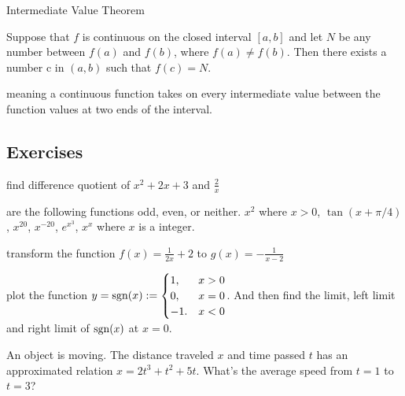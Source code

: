 \documentclass[Calculus 1 Recitation.tex]{subfiles}
\begin{document}
\begin{myleftlinebox}
	Intermediate Value Theorem
	\tcblower
	\begin{theorem}\label{thm:intermediateValue}
		Suppose that $f$ is continuous on the closed interval $[a, b]$ and let $N$ be any number between $f(a)$ and $f(b)$, where $f(a) \neq f(b)$. Then there exists a number c in $(a, b)$ such that $f(c) = N$.
	\end{theorem}
	meaning a continuous function takes on every intermediate value between the function values at two ends of the interval.
\end{myleftlinebox}


\subsection{Exercises}

\begin{myleftlinebox}
	find difference quotient of \(x^2+2x+3\) and \(\frac{2}{x}\)
	\tcblower
	\vspace{2em}
\end{myleftlinebox}

\begin{myleftlinebox}
	are the following functions odd, even, or neither. \(x^2\) where \(x>0\), \(\tan(x+\pi/4)\), \(x^{20}\), \(x^{-20}\), \(e^{x^3}\), $x^x$ where $x$ is a integer.
	\tcblower
	\vspace{5em}
\end{myleftlinebox}

\begin{myleftlinebox}
	transform the function $f(x)=\frac{1}{2x}+2$ to $g(x)=-\frac{1}{x-2}$
	\tcblower
	\vspace{2em}
\end{myleftlinebox}

\begin{myleftlinebox}
	plot the function $y=\operatorname{\mathrm{sgn}}(x) := \begin{cases}
		1, & x>0\\
		0, & x=0\\
		-1.& x<0
	\end{cases}$. And then find the limit, left limit and right limit of $\operatorname{\mathrm{sgn}}(x)$ at $x=0$.
	\tcblower
	\vspace{3em}
\end{myleftlinebox}

\begin{myleftlinebox}
	An object is moving. The distance traveled $x$ and time passed $t$ has an approximated relation $x = 2t^3+t^2+5t$. What's the average speed from $t=1$ to $t=3$?
	\tcblower
	\vspace{2em}
\end{myleftlinebox}
\end{document}
